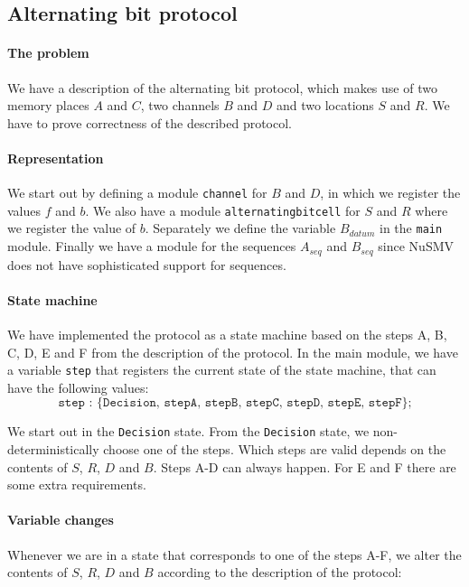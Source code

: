 \documentclass[12pt]{article}
\begin{document}
\clearpage

\subsection*{Alternating bit protocol}
\paragraph{The problem}
We have a description of the alternating bit protocol,
which makes use of two memory places $A$ and $C$, two channels $B$ and $D$ and two locations $S$ and $R$.
We have to prove correctness of the described protocol.

\paragraph{Representation}
We start out by defining a module \texttt{channel} 
for $B$ and $D$, in which we register the values $f$ and $b$.
We also have a module \texttt{alternatingbitcell} for $S$ and $R$ 
where we register the value of $b$. 
Separately we define the variable $B_{datum}$ in the \texttt{main} module.
Finally we have a module for the sequences $A_{seq}$ and $B_{seq}$ since NuSMV does not have sophisticated support for sequences.

\paragraph{State machine}
We have implemented the protocol as a state machine 
based on the steps A, B, C, D, E and F from the description of the protocol. 
In the main module, we have a variable \texttt{step}
that registers the current state of the state machine, 
that can have the following values:
\[ \texttt{step : \{Decision, stepA, stepB, stepC, stepD, stepE, stepF\};}\]

We start out in the \texttt{Decision} state. 
From the \texttt{Decision} state, we non-deterministically choose one of the steps. 
Which steps are valid depends on the contents of $S$, $R$, $D$ and $B$.
Steps A-D can always happen. 
For E and F there are some extra requirements. 

\paragraph{Variable changes}
Whenever we are in a state that corresponds to one of the steps A-F, 
we alter the contents of $S$, $R$, $D$ and $B$ according 
to the description of the protocol:
\end{document}
